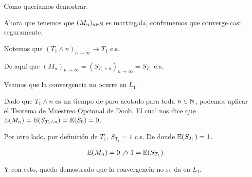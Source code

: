 \begin{itemize}
			Como queríamos demostrar.
	\end{itemize}
	
	Ahora que tenemos que $(M_n)_{n \in \mathbb{N}}$ es martingala, confirmemos que converge casi seguramente.\pn
	
	Notemos que $(T_1 \wedge n)_{n \rightarrow \infty} \rightarrow T_1$ c.s.\pn
	
	De aquí que $(M_n)_{n \rightarrow \infty} = (S_{T_1 \wedge n})_{n \rightarrow \infty} = S_{T_1}$ c.s.\pn				
	
	Veamos que la convergencia no ocurre en $L_1$.\pn
				
	Dado que $T_1 \wedge n$ es un tiempo de paro acotado para toda $n \in \mathbb{N}$,
	podemos aplicar el Teorema de Muestreo Opcional de 	Doob. 
	El cual nos dice que $\mathbb{E}(M_n) = \mathbb{E}(S_{T_1 \wedge n}) = \mathbb{E}(S_0) = 0$.\pn
	
	Por otro lado, por definición de $T_1$, $S_{T_1} = 1$ c.s.	De donde $\mathbb{E}(S_{T_1}) = 1$.
	
	\begin{align}
		\mathbb{E}(M_n) = 0 \not\rightarrow 1 = \mathbb{E}(S_{T_1}).
	\end{align}\pn			
	
	Y con esto, queda demostrado que la convergencia no se da en $L_1$.	